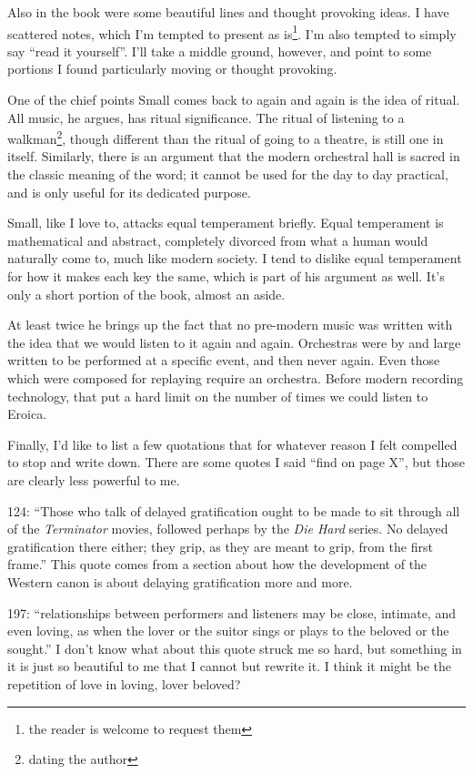 \documentclass[12pt]{article}
\newcommand{\say}[1]{``#1''}
\renewcommand{\,}{\textsuperscript{,}}
\begin{document}
Also in the book were some beautiful lines and thought provoking ideas.  
I have scattered notes, which I'm tempted to present as is\footnote{the reader is welcome to request them}.  
I'm also tempted to simply say \say{read it yourself}.  
I'll take a middle ground, however, and point to some portions I found particularly moving or thought provoking.

One of the chief points Small comes back to again and again is the idea of ritual.  
All music, he argues, has ritual significance.  
The ritual of listening to a walkman\footnote{dating the author}, though different than the ritual of going to a theatre, is still one in itself.  
Similarly, there is an argument that the modern orchestral hall is sacred in the classic meaning of the word; it cannot be used for the day to day practical, and is only useful for its dedicated purpose.

Small, like I love to, attacks equal temperament briefly.  
Equal temperament is mathematical and abstract, completely divorced from what a human would naturally come to, much like modern society.  
I tend to dislike equal temperament for how it makes each key the same, which is part of his argument as well.  
It's only a short portion of the book, almost an aside.

At least twice he brings up the fact that no pre-modern music was written with the idea that we would listen to it again and again.  
Orchestras were by and large written to be performed at a specific event, and then never again.  
Even those which were composed for replaying require an orchestra.  
Before modern recording technology, that put a hard limit on the number of times we could listen to Eroica.

Finally, I'd like to list a few quotations that for whatever reason I felt compelled to stop and write down.  
There are some quotes I said \say{find on page X}, but those are clearly less powerful to me.

124: \say{Those who talk of delayed gratification ought to be made to sit through all of the \textit{Terminator} movies, followed perhaps by the \textit{Die Hard} series. No delayed gratification there either; they grip, as they are meant to grip, from the first frame.}  
This quote comes from a section about how the development of the Western canon is about delaying gratification more and more.

197: \say{relationships between performers and listeners may be close, intimate, and even loving, as when the lover or the suitor sings or plays to the beloved or the sought.}  
I don't know what about this quote struck me so hard, but something in it is just so beautiful to me that I cannot but rewrite it.  
I think it might be the repetition of love in loving, lover beloved?
\end{document}
